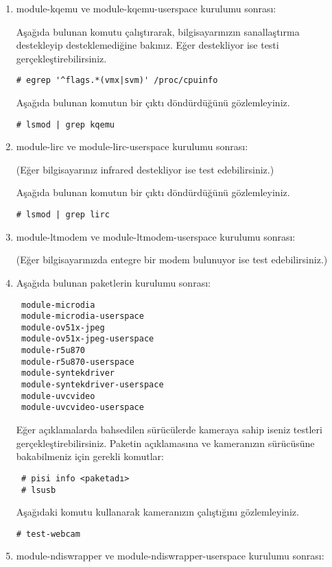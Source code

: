 \documentclass[a4paper,10pt]{article}
\begin{document}
\begin{enumerate}
\item module-kqemu ve module-kqemu-userspace kurulumu sonrası:

Aşağıda bulunan komutu çalıştırarak, bilgisayarınızın sanallaştırma destekleyip desteklemediğine bakınız. Eğer destekliyor ise testi gerçekleştirebilirsiniz. 
\begin{verbatim}
# egrep '^flags.*(vmx|svm)' /proc/cpuinfo
\end{verbatim}

Aşağıda bulunan komutun bir çıktı döndürdüğünü gözlemleyiniz.
\begin{verbatim}
# lsmod | grep kqemu
\end{verbatim}

\item module-lirc ve module-lirc-userspace kurulumu sonrası:

(Eğer bilgisayarınız infrared destekliyor ise test edebilirsiniz.)

Aşağıda bulunan komutun bir çıktı döndürdüğünü gözlemleyiniz.
\begin{verbatim}
# lsmod | grep lirc
\end{verbatim}

\item module-ltmodem ve module-ltmodem-userspace kurulumu sonrası:

(Eğer bilgisayarınızda entegre bir modem bulunuyor ise test edebilirsiniz.)


\item Aşağıda bulunan paketlerin kurulumu sonrası:
\begin{verbatim}
 module-microdia
 module-microdia-userspace
 module-ov51x-jpeg
 module-ov51x-jpeg-userspace
 module-r5u870
 module-r5u870-userspace
 module-syntekdriver
 module-syntekdriver-userspace
 module-uvcvideo
 module-uvcvideo-userspace
\end{verbatim}

Eğer açıklamalarda bahsedilen sürücülerde kameraya sahip iseniz testleri gerçekleştirebilirsiniz.
Paketin açıklamasına ve kameranızın sürücüsüne bakabilmeniz için gerekli komutlar:
\begin{verbatim}
 # pisi info <paketadı>
 # lsusb
\end{verbatim}

Aşağıdaki komutu kullanarak kameranızın çalıştığını gözlemleyiniz.
\begin{verbatim}
# test-webcam
\end{verbatim}

\item module-ndiswrapper ve module-ndiswrapper-userspace kurulumu sonrası:


\end{enumerate}
\end{document}
